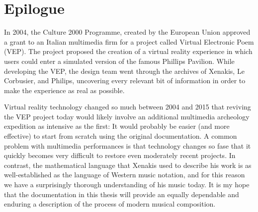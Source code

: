
\clearpage
\chapter*{Epilogue}
\label{ch:epilogue}

In 2004, the Culture 2000 Programme, created by the European Union
approved a grant to an Italian multimedia firm for a project called
Virtual Electronic Poem (VEP).\cite{eu2004} The project proposed the
creation of a virtual reality experience in which users could enter a
simulated version of the famous Phillips Pavilion. While developing
the VEP, the design team went through the archives of Xenakis, Le
Corbusier, and Philips, uncovering every relevant bit of information
in order to make the experience as real as
possible.\cite{Lombardo2009}

Virtual reality technology changed so much between 2004 and 2015 that
reviving the VEP project today would likely involve an additional
multimedia archeology expedition as intensive as the first: It would
probably be easier (and more effective) to start from scratch using
the original documentation. A common problem with multimedia
performances is that technology changes so fase that it quickly
becomes very difficult to restore even moderately recent
projects.\cite{Lombardo2006} In contrast, the mathematical language
that Xenakis used to describe his work is as well-established as the
language of Western music notation, and for this reason we have a
surprisingly thorough understanding of his music today. It is my hope
that the documentation in this thesis will provide an equally
dependable and enduring a description of the process of modern musical
composition.





